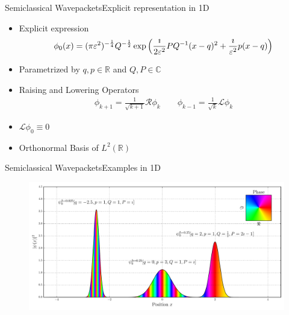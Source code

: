 \documentclass{beamer}
\begin{document}
\begin{frame}{Semiclassical Wavepackets}{Explicit representation in 1D}
  \begin{itemize}
    \item Explicit expression
    {\scriptsize
    \begin{align*}
      \phi_0(x) = (\pi\varepsilon^2)^{-\frac{1}{4}} Q^{-\frac{1}{2}}
                   \exp \left( \frac{\imath}{2\varepsilon^2} PQ{}^{-1} (x-q)^2 + \frac{\imath}{\varepsilon^2} p (x-q) \right)
    \end{align*}}
    \item Parametrized by $q, p \in \mathbb{R}$ and $Q, P \in \mathbb{C}$
    \item Raising and Lowering Operators
    \begin{align*}
      \phi_{k+1} = \frac{1}{\sqrt{k+1}} \mathcal{R} \phi_k
      \qquad
      \phi_{k-1} = \frac{1}{\sqrt{k}} \mathcal{L} \phi_k
    \end{align*}
    \item $\mathcal{L} \phi_0 \equiv 0$
    \item Orthonormal Basis of $L^2(\mathbb{R})$
  \end{itemize}
\end{frame}


\begin{frame}{Semiclassical Wavepackets}{Examples in 1D}
  \begin{figure}
    \centering
    \includegraphics[width=\linewidth]{./fig/wavepackets.pdf}
  \end{figure}
\end{frame}
\end{document}
